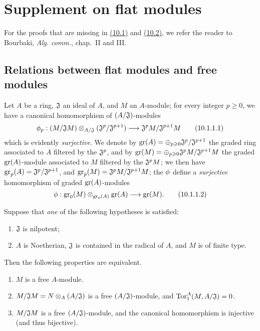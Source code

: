 \section{Supplement on flat modules}
\label{section:supplement-on-flat-modules}

For the proofs that are missing in \hyperref[subsection:relations-between-flat-modules-and-free-modules]{(10.1)} and \hyperref[subsection:local-flatness-criteria]{(10.2)}, we refer the reader to Bourbaki, \emph{Alg. comm.}, chap.~II and III.

\subsection{Relations between flat modules and free modules}
\label{subsection:relations-between-flat-modules-and-free-modules}

\begin{env}[10.1.1]
\label{0.10.1.1}
Let $A$ be a ring, $\mathfrak{J}$ an ideal of $A$, and $M$ an $A$-module;
for every integer $p\geq0$, we have a canonical homomorphism of $(A/\mathfrak{J})$-modules
\begin{equation*}
\label{0.10.1.1.1}
    \vphi_p: (M/\fk{J}M) \otimes_{A/\fk{J}} (\fk{J}^p/\fk{J}^{p+1}) \to \fk{J}^pM/\fk{J}^{p+1}M\tag{10.1.1.1}
\end{equation*}
which is evidently \emph{surjective}.
We denote by ${\mathop{\mathrm{gr}}\nolimits}(A)=\oplus_{p\geqslant0}\mathfrak{J}^p/\mathfrak{J}^{p+1}$ the graded ring associated to $A$ filtered by the $\mathfrak{J}^p$, and by ${\mathop{\mathrm{gr}}\nolimits}(M)=\oplus_{p\geqslant0}\mathfrak{J}^pM/\mathfrak{J}^{p+1}M$ the graded ${\mathop{\mathrm{gr}}\nolimits}(A)$-module associated to $M$ filtered by the $\mathfrak{J}^pM$;
we then have ${\mathop{\mathrm{gr}}\nolimits}_p(A)=\mathfrak{J}^p/\mathfrak{J}^{p+1}$, and ${\mathop{\mathrm{gr}}\nolimits}_p(M)=\mathfrak{J}^pM/\mathfrak{J}^{p+1}M$;
the $\phi$ define a \emph{surjective} homomorphism of graded ${\mathop{\mathrm{gr}}\nolimits}(A)$-modules
\begin{equation*}
\label{0.10.1.1.2}
    \vphi: \gr_0(M) \otimes_{\gr_0(A)} \gr(A) \to \gr(M).\tag{10.1.1.2}
\end{equation*}
\end{env}

\begin{env}[10.1.2]
\label{0.10.1.2}
Suppose that \emph{one} of the following hypotheses is satisfied:
\begin{enumerate}[label=\emph{(\roman*)}]
    \item $\mathfrak{J}$ is nilpotent;
    \item $A$ is Noetherian, $\mathfrak{J}$ is contained in the radical of $A$, and $M$ is of finite type.
\end{enumerate}
Then the following properties are equivalent.
\begin{enumerate}[label=\emph{(\alph*)}]
    \item $M$ is a free $A$-module.
    \item $M/\mathfrak{J}M=N\otimes_A(A/\mathfrak{J})$ is a free $(A/\mathfrak{J})$-module, and ${\mathop{\mathrm{Tor}}\nolimits}_1^A(M,A/\mathfrak{J})=0$.
    \item $M/\mathfrak{J}M$ is a free $(A/\mathfrak{J})$-module, and the canonical homomorphism  is injective (and thus bijective).
\end{enumerate}
\end{env}

